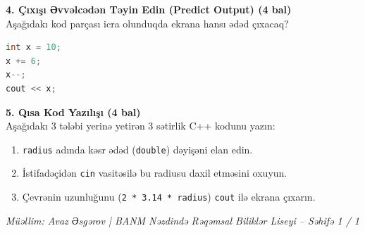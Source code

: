 \documentclass[10pt,a4paper]{article}
\begin{document}
\vspace{0.35cm}
\textbf{4. Çıxışı Əvvəlcədən Təyin Edin (Predict Output) (4 bal)}\\
Aşağıdakı kod parçası icra olunduqda ekrana hansı ədəd çıxacaq?

\begin{minipage}[t]{0.52\textwidth}
\begin{lstlisting}[language=C++]
int x = 10;
x += 6;
x--;
cout << x;
\end{lstlisting}
\end{minipage}
\hfill
\begin{minipage}[t]{0.44\textwidth}
\noindent{}
\end{minipage}

\vspace{0.35cm}
\textbf{5. Qısa Kod Yazılışı (4 bal)}\\
Aşağıdakı 3 tələbi yerinə yetirən 3 sətirlik C++ kodunu yazın:
\begin{enumerate}
    \itemsep0em
    \item \texttt{radius} adında kəsr ədəd (\texttt{double}) dəyişəni elan edin.
    \item İstifadəçidən \texttt{cin} vasitəsilə bu radiusu daxil etməsini oxuyun.
    \item Çevrənin uzunluğunu (\texttt{2 * 3.14 * radius}) \texttt{cout} ilə ekrana çıxarın.
\end{enumerate}

\noindent{}

\vfill
\begin{center}
\footnotesize \textit{Müəllim: Avaz Əsgərov | BANM Nəzdində Rəqəmsal Biliklər Liseyi -- Səhifə 1 / 1}
\end{center}
\end{document}
